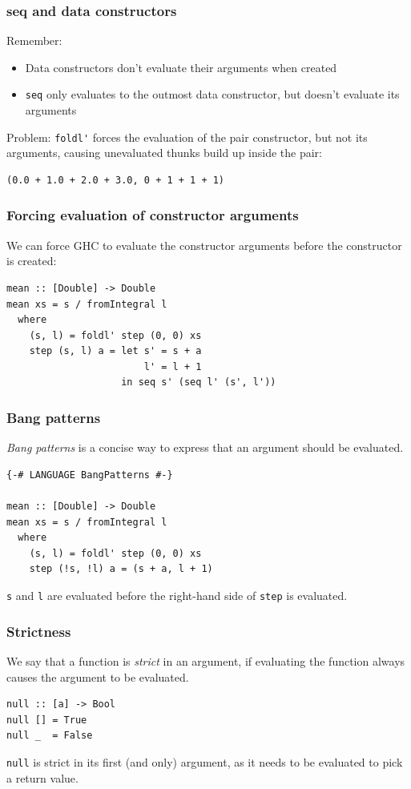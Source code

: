 \documentclass{beamer}
\begin{document}
\begin{frame}[fragile]
  \frametitle{seq and data constructors}

  Remember:
  \begin{itemize}
  \item Data constructors don't evaluate their arguments when
    created
  \item \lstinline!seq! only evaluates to the outmost data
    constructor, but doesn't evaluate its arguments
  \end{itemize}

  Problem: \lstinline!foldl'! forces the evaluation of the pair
  constructor, but not its arguments, causing unevaluated thunks build
  up inside the pair:

\begin{verbatim}
(0.0 + 1.0 + 2.0 + 3.0, 0 + 1 + 1 + 1)
\end{verbatim}
\end{frame}

\begin{frame}[fragile]
  \frametitle{Forcing evaluation of constructor arguments}

  We can force GHC to evaluate the constructor arguments before the
  constructor is created:

  \begin{lstlisting}
mean :: [Double] -> Double
mean xs = s / fromIntegral l
  where
    (s, l) = foldl' step (0, 0) xs
    step (s, l) a = let s' = s + a
                        l' = l + 1
                    in seq s' (seq l' (s', l'))
  \end{lstlisting}
\end{frame}

\begin{frame}[fragile]
  \frametitle{Bang patterns}

  \emph{Bang patterns} is a concise way to express that an argument
  should be evaluated.

  \begin{lstlisting}
{-# LANGUAGE BangPatterns #-}

mean :: [Double] -> Double
mean xs = s / fromIntegral l
  where
    (s, l) = foldl' step (0, 0) xs
    step (!s, !l) a = (s + a, l + 1)
  \end{lstlisting}

  \lstinline!s! and \lstinline!l! are evaluated before the right-hand
  side of \lstinline!step! is evaluated.
\end{frame}

\begin{frame}[fragile]
  \frametitle{Strictness}

  We say that a function is \emph{strict} in an argument, if
  evaluating the function always causes the argument to be evaluated.

  \begin{lstlisting}
null :: [a] -> Bool
null [] = True
null _  = False
  \end{lstlisting}

  \lstinline!null! is strict in its first (and only) argument, as it
  needs to be evaluated to pick a return value.
\end{frame}
\end{document}
